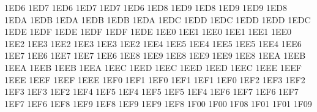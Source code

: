 \setcclcuc 1ED6 1ED7 1ED6 %
\setcclcuc 1ED7 1ED7 1ED6 %
\setcclcuc 1ED8 1ED9 1ED8 %
\setcclcuc 1ED9 1ED9 1ED8 %
\setcclcuc 1EDA 1EDB 1EDA %
\setcclcuc 1EDB 1EDB 1EDA %
\setcclcuc 1EDC 1EDD 1EDC %
\setcclcuc 1EDD 1EDD 1EDC %
\setcclcuc 1EDE 1EDF 1EDE %
\setcclcuc 1EDF 1EDF 1EDE %
\setcclcuc 1EE0 1EE1 1EE0 %
\setcclcuc 1EE1 1EE1 1EE0 %
\setcclcuc 1EE2 1EE3 1EE2 %
\setcclcuc 1EE3 1EE3 1EE2 %
\setcclcuc 1EE4 1EE5 1EE4 %
\setcclcuc 1EE5 1EE5 1EE4 %
\setcclcuc 1EE6 1EE7 1EE6 %
\setcclcuc 1EE7 1EE7 1EE6 %
\setcclcuc 1EE8 1EE9 1EE8 %
\setcclcuc 1EE9 1EE9 1EE8 %
\setcclcuc 1EEA 1EEB 1EEA %
\setcclcuc 1EEB 1EEB 1EEA %
\setcclcuc 1EEC 1EED 1EEC %
\setcclcuc 1EED 1EED 1EEC %
\setcclcuc 1EEE 1EEF 1EEE %
\setcclcuc 1EEF 1EEF 1EEE %
\setcclcuc 1EF0 1EF1 1EF0 %
\setcclcuc 1EF1 1EF1 1EF0 %
\setcclcuc 1EF2 1EF3 1EF2 %
\setcclcuc 1EF3 1EF3 1EF2 %
\setcclcuc 1EF4 1EF5 1EF4 %
\setcclcuc 1EF5 1EF5 1EF4 %
\setcclcuc 1EF6 1EF7 1EF6 %
\setcclcuc 1EF7 1EF7 1EF6 %
\setcclcuc 1EF8 1EF9 1EF8 %
\setcclcuc 1EF9 1EF9 1EF8 %
\setcclcuc 1F00 1F00 1F08 %
\setcclcuc 1F01 1F01 1F09 %
